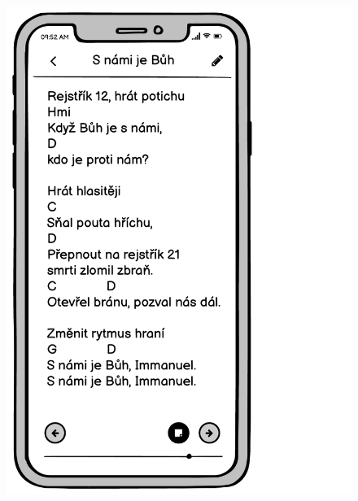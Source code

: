 \begin{figure}
    \includegraphics[width=\textwidth/3 - 2pt]{images/3-navrh/3-6-detail-pisne-clen.pdf}

\end{figure}
